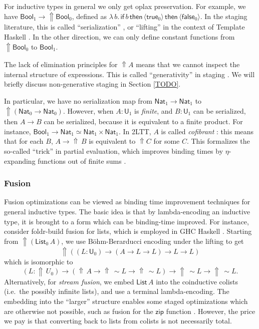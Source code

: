 \documentclass[acmsmall]{acmart}
\newcommand{\msf}[1]{\mathsf{#1}}
\newcommand{\Lift}{{\Uparrow}}
\newcommand{\spl}{{\sim}}
\newcommand{\qut}[1]{\langle #1\rangle}
\renewcommand{\U}{\msf{U}}
\newcommand{\Bool}{\msf{Bool}}
\newcommand{\true}{\msf{true}}
\newcommand{\false}{\msf{false}}
\newcommand{\List}{\msf{List}}
\newcommand{\Nat}{\msf{Nat}}
\theoremstyle{remark}
\begin{document}
For inductive types in general we only get oplax preservation. For example, we
have $\Bool_1 \to \Lift \Bool_0$, defined as
$\lambda\,b.\,\msf{if}\,b\,\msf{then}\,\qut{\true_0}\,\msf{then}\,\qut{\false_0}$.
In the staging literature, this is called ``serialization'' \cite{TODO}, or
``lifting'' in the context of Template Haskell \cite{TODO}. In the other
direction, we can only define constant functions from $\Lift \Bool_0$ to
$\Bool_1$.

The lack of elimination principles for $\Lift A$ means that we cannot inspect
the internal structure of expressions. This is called ``generativity'' in
staging \cite{TODO}. We will briefly discuss non-generative staging in Section
\ref{TODO}.

In particular, we have no serialization map from $\Nat_1 \to \Nat_1$ to
$\Lift(\Nat_0 \to \Nat_0)$. However, when $A : \U_1$ is \emph{finite}, and $B :
\U_1$ can be serialized, then $A \to B$ can be serialized, because it is
equivalent to a finite product. For instance, $\Bool_1 \to \Nat_1 \simeq \Nat_1
\times \Nat_1$.  In 2LTT, $A$ is called \emph{cofibrant} \cite{TODO}: this means
that for each $B$, $A \to \Lift\,B$ is equivalent to $\Lift C$ for some
$C$. This formalizes the so-called ``trick'' in partial evaluation, which
improves binding times by $\eta$-expanding functions out of finite sums
\cite{TODO}.

\subsubsection{Fusion}
Fusion optimizations can be viewed as binding time improvement techniques for
general inductive types. The basic idea is that by lambda-encoding an inductive
type, it is brought to a form which can be binding-time improved. For instance,
consider foldr-build fusion for lists, which is employed in GHC Haskell
\cite{TODO}. Starting from $\Lift (\List_0\,A)$, we use Böhm-Berarducci
encoding \cite{TODO} under the lifting to get
\[ \Lift((L : \U_0) \to (A \to L \to L) \to L \to L) \]
which is isomorphic to
\[ (L : \Lift\,U_0) \to (\Lift\,A \to \Lift\,\spl L \to \Lift\,\spl L)
    \to \Lift\,\spl L \to \Lift\,\spl L. \]
Alternatively, for \emph{stream fusion}, we embed $\List\,A$ into the
coinductive colists (i.e.\ the possibly infinite lists), and use a terminal
lambda-encoding. The embedding into the ``larger'' structure enables some staged
optimizations which are otherwise not possible, such as fusion for the
$\msf{zip}$ function \cite{TODO}. However, the price we pay is that converting
back to lists from colists is not necessarily total.
\end{document}
